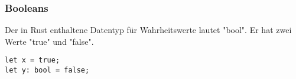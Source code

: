 \subsubsection{Booleans}
Der in Rust enthaltene Datentyp für Wahrheitswerte lautet "bool".
Er hat zwei Werte "true" und "false".

\begin{lstlisting}
let x = true;
let y: bool = false;
\end{lstlisting}
